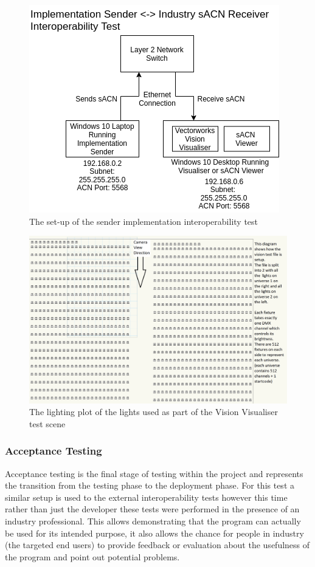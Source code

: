 \documentclass[11pt,a4paper]{report}
\begin{document}
\begin{figure}[H]
	\label{VIS_VIEWER_SETUP}
	\includegraphics[width=\textwidth]{CS4099-Visualiser-setup.png}
	\caption{The set-up of the sender implementation interoperability test}
\end{figure}

\begin{figure}[H]
	\label{VIS_LX_PLOT}
	\includegraphics[width=\textwidth]{Vision-File-LX-Plot.png}
	\caption{The lighting plot of the lights used as part of the Vision Visualiser test scene}
\end{figure}

\subsubsection{Acceptance Testing}
Acceptance testing is the final stage of testing within the project and represents the transition from the testing phase to the deployment phase. For this test a similar setup is used to the external interoperability tests however this time rather than just the developer these tests were performed in the presence of an industry professional. This allows demonstrating that the program can actually be used for its intended purpose, it also allows the chance for people in industry (the targeted end users) to provide feedback or evaluation about the usefulness of the program and point out potential problems. \\
\end{document}
